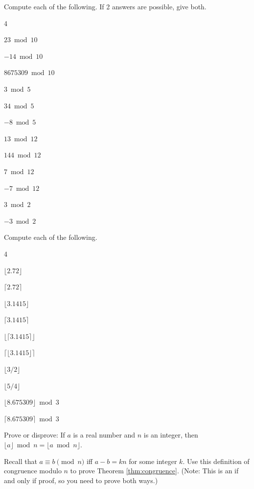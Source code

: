 \newpage
\begin{pro}
Compute each of the following. If 2 answers are possible, give both.
\begin{multicols}{4}
\begin{lenum}
\item $23 \bmod 10$
\item $-14 \bmod 10$
\item $8675309 \bmod 10$
\item $3 \bmod 5$
\item $34 \bmod 5$
\item $-8 \bmod 5$
\item $13 \bmod 12$
\item $144 \bmod 12$
\item $7 \bmod 12$
\item $-7 \bmod 12$
\item $3 \bmod 2$
\item $-3 \bmod 2$
\end{lenum}
\end{multicols}
\end{pro}

\begin{pro}
Compute each of the following.
\begin{multicols}{4}
\begin{lenum}
\item $\lfloor 2.72\rfloor$
\item $\lceil 2.72\rceil$
\item $\lfloor 3.1415\rfloor$
\item $\lceil 3.1415\rceil$
\item $\lfloor\lceil 3.1415\rceil\rfloor$
\item $\lceil\lfloor 3.1415\rfloor\rceil$
\item $\lfloor 3/2\rfloor$
\item $\lfloor 5/4\rfloor$
\item $\lfloor 8.675309\rfloor \bmod 3$
\item $\lceil 8.675309\rceil \bmod 3$
\end{lenum}
\end{multicols}
\end{pro}

\begin{pro}
Prove or disprove: If $a$ is a real number and $n$ is an integer, then $\lfloor a \rfloor \bmod n = \lfloor a\bmod n \rfloor$.
\end{pro}

\begin{pro}
Recall that 
$a\equiv b \pmod n$ iff $a-b=kn$ for some integer $k$.
Use this definition of congruence modulo $n$ 
to prove Theorem \ref{thm:congruence}.  
(Note: This is an if and only if proof, so you need to prove both ways.)
\end{pro}

